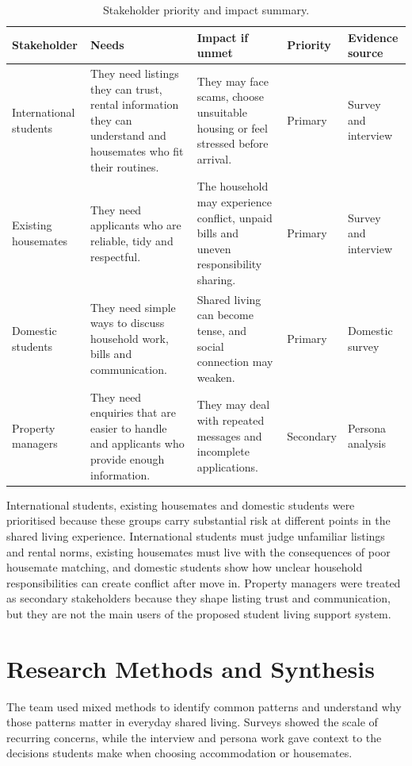 \documentclass[11pt,a4paper]{article}
\begin{document}
\begin{table}[H]
    \centering
    \small
    \caption{Stakeholder priority and impact summary.}
    \begin{tabularx}{\textwidth}{@{}L{2.7cm} Y Y L{1.9cm} L{2.4cm}@{}}
        \toprule
        Stakeholder & Needs & Impact if unmet & Priority & Evidence source\\
        \midrule
        International students & They need listings they can trust, rental information they can understand and housemates who fit their routines. & They may face scams, choose unsuitable housing or feel stressed before arrival. & Primary & Survey and interview\\
        Existing housemates & They need applicants who are reliable, tidy and respectful. & The household may experience conflict, unpaid bills and uneven responsibility sharing. & Primary & Survey and interview\\
        Domestic students & They need simple ways to discuss household work, bills and communication. & Shared living can become tense, and social connection may weaken. & Primary & Domestic survey\\
        Property managers & They need enquiries that are easier to handle and applicants who provide enough information. & They may deal with repeated messages and incomplete applications. & Secondary & Persona analysis\\
        \bottomrule
    \end{tabularx}
    \label{tabstakeholders}
\end{table}

International students, existing housemates and domestic students were prioritised because these groups carry substantial risk at different points in the shared living experience. International students must judge unfamiliar listings and rental norms, existing housemates must live with the consequences of poor housemate matching, and domestic students show how unclear household responsibilities can create conflict after move in. Property managers were treated as secondary stakeholders because they shape listing trust and communication, but they are not the main users of the proposed student living support system.

\section{Research Methods and Synthesis}

The team used mixed methods to identify common patterns and understand why those patterns matter in everyday shared living. Surveys showed the scale of recurring concerns, while the interview and persona work gave context to the decisions students make when choosing accommodation or housemates.
\end{document}
